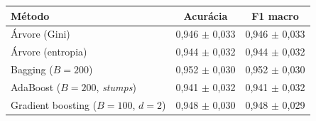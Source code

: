 \begin{tabular}{@{}lcc@{}}
\toprule
Método & Acurácia & F1 macro \\
\midrule
Árvore (Gini) & 0,946 $\pm$ 0,033 & 0,946 $\pm$ 0,033 \\
Árvore (entropia) & 0,944 $\pm$ 0,032 & 0,944 $\pm$ 0,032 \\
Bagging ($B=200$) & 0,952 $\pm$ 0,030 & 0,952 $\pm$ 0,030 \\
AdaBoost ($B=200$, \emph{stumps}) & 0,941 $\pm$ 0,032 & 0,941 $\pm$ 0,032 \\
Gradient boosting ($B=100$, $d=2$) & 0,948 $\pm$ 0,030 & 0,948 $\pm$ 0,029 \\
\bottomrule
\end{tabular}
